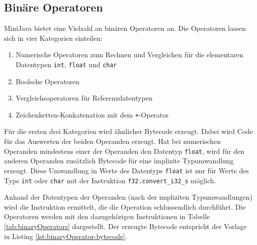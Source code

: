 

\subsection{Binäre Operatoren}

MiniJava bietet eine Vielzahl an binären Operatoren an. Die Operatoren lassen sich in vier Kategorien einteilen:
\begin{enumerate}
    \item Numerische Operatoren zum Rechnen und Vergleichen für die elementaren Datentypen \lstinline{int}, \lstinline{float} und \lstinline{char}
    \item Boolsche Operatoren
    \item Vergleichsoperatoren für Referenzdatentypen
    \item Zeichenketten-Konkatenation mit dem \lstinline{+}-Operator
\end{enumerate}

Für die ersten drei Kategorien wird ähnlicher Bytecode erzeugt. Dabei wird Code für das Auswerten der beiden Operanden erzeugt. Hat bei numerischen Operanden mindestens einer der Operanden den Datentyp \lstinline{float}, wird für den anderen Operanden zusätzlich Bytecode für eine implizite Typumwandlung erzeugt. Diese Umwandlung in Werte des Datentyps \lstinline{float} ist nur für Werte des Typs \lstinline{int} oder \lstinline{char} mit der Instruktion \lstinline{f32.convert_i32_s} möglich.

Anhand der Datentypen der Operanden (nach der impliziten Typumwandlungen) wird die Instruktion ermittelt, die die Operation schlussendlich durchführt. Die Operatoren werden mit den dazugehörigen Instruktionen in Tabelle \ref{tab:binaryOperators} dargestellt. Der erzeugte Bytecode entspricht der Vorlage in Listing \ref{lst:binaryOperator-bytecode}.


